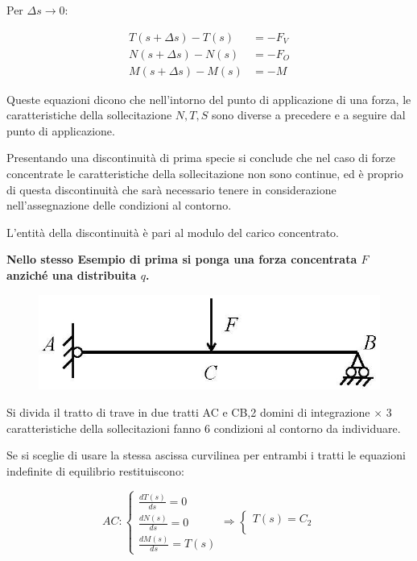 \documentclass{article}
\begin{document}
\begin{adjustwidth}{2in}{}
	Per $\Delta s \rightarrow 0$: 
	
	\[\boxed{\begin{aligned}
	T(s+\Delta s) - T(s) & =- F_V \\
	N(s+\Delta s) - N(s) & =- F_O \\
	M(s+\Delta s) - M(s) & =-M
	\end{aligned}}\]
	
	Queste equazioni dicono che nell'intorno del punto di applicazione di una forza, le caratteristiche della sollecitazione $N,T,S$ sono diverse a precedere e a seguire dal punto di applicazione.\newline
	
	Presentando una discontinuità di prima specie si conclude che nel caso di forze concentrate le caratteristiche della sollecitazione non sono continue, ed è proprio di questa discontinuità che sarà necessario tenere in considerazione nell'assegnazione delle condizioni al contorno. \newline
  	
	L’entità della discontinuità è pari al modulo del carico concentrato. \newpage
	
\begin{center}
\textbf{		Nello stesso Esempio di prima si ponga una forza concentrata $F$ anziché una distribuita $q$.}
\end{center}
	
\begin{figure}[H]
	\centering
	\includegraphics[width=0.3\linewidth]{"immagini/1.PARTE5_Pagina_19"}
\end{figure}
	Si divida il tratto di trave in due tratti AC e CB,2 domini di integrazione $\times$ 3 caratteristiche della sollecitazioni fanno 6 condizioni al contorno da individuare.
	
	Se si sceglie di usare la stessa ascissa curvilinea per entrambi i tratti le equazioni indefinite di equilibrio restituiscono: 
	
	\[
AC:	\begin{cases}
		\frac{dT(s)}{ds}= 0 \\
		
		\frac{dN(s)}{ds}  = 0 \\
		
		\frac{dM(s)}{ds} = T(s) 
	\end{cases} \Rightarrow \begin{cases}
		T(s) = C_2 \\
		

\end{cases}\]
\end{adjustwidth}
\end{document}
